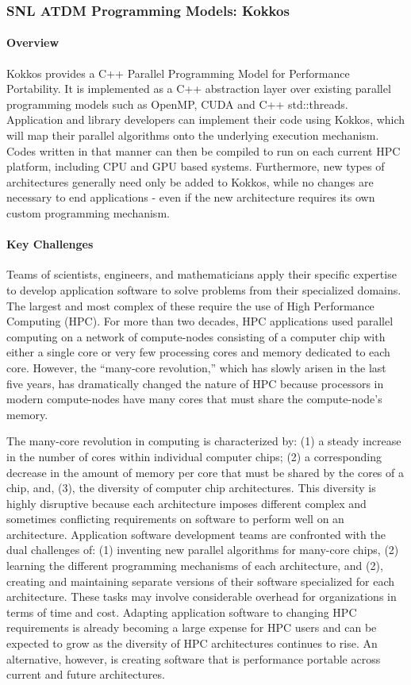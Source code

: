 \subsubsection{ SNL ATDM Programming Models: Kokkos} 

\paragraph{Overview} 
Kokkos provides a C++ Parallel Programming Model for Performance Portability. 
It is implemented as a C++ abstraction layer over existing parallel programming models such as OpenMP, CUDA and C++ std::threads. 
Application and library developers can implement their code using Kokkos, 
which will map their parallel algorithms onto the underlying execution mechanism. 
Codes written in that manner can then be compiled to run on each current HPC platform, including CPU and GPU based systems.
Furthermore, new types of architectures generally need only be added to Kokkos, while no changes are necessary to end applications - even if the new architecture requires its own custom programming mechanism. 

\paragraph{Key  Challenges}
Teams of scientists, engineers, and mathematicians apply their specific expertise to develop application software 
to solve problems from their specialized domains. 
The largest and most complex of these require the use of High Performance Computing (HPC). 
For more than two decades, HPC applications used parallel computing on a network of compute-nodes 
consisting of a computer chip with either a single core or very few processing cores 
and memory dedicated to each core. 
However, the “many-core revolution,” which has slowly arisen in the last five years, 
has dramatically changed the nature of HPC because processors in modern compute-nodes 
have many cores that must share the compute-node’s memory.

The many-core revolution in computing is characterized by: 
(1) a steady increase in the number of cores within individual computer chips; 
(2) a corresponding decrease in the amount of memory per core that must be shared by the cores of a chip, and, 
(3), the diversity of computer chip architectures. 
This diversity is highly disruptive because each architecture imposes different complex 
and sometimes conflicting requirements on software to perform well on an architecture. 
Application software development teams are confronted with the dual challenges of: 
(1) inventing new parallel algorithms for many-core chips, 
(2) learning the different programming mechanisms of each architecture, and
(2), creating and maintaining separate versions of their software specialized for each architecture. 
These tasks may involve considerable overhead for organizations in terms of time and cost. 
Adapting application software to changing HPC requirements is already becoming a large expense for 
HPC users and can be expected to grow as the diversity of HPC architectures continues to rise.
An alternative, however, is creating software that is performance portable across current and future architectures. 


